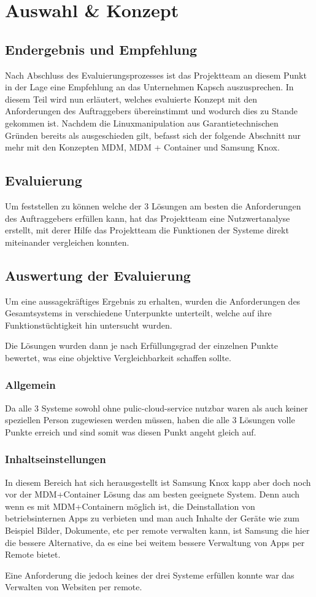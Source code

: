 \chapter{Auswahl \& Konzept}
\section{Endergebnis und Empfehlung}
Nach Abschluss des Evaluierungsprozesses ist das Projektteam an diesem Punkt in der Lage eine Empfehlung an das Unternehmen Kapsch auszusprechen. In diesem Teil wird nun erläutert, welches evaluierte Konzept mit den Anforderungen des Auftraggebers übereinstimmt und wodurch dies zu Stande gekommen ist. Nachdem die Linuxmanipulation aus Garantietechnischen Gründen bereits als ausgeschieden gilt, befasst sich der folgende Abschnitt nur mehr mit den Konzepten MDM, MDM + Container und Samsung Knox.
\section{Evaluierung}
Um feststellen zu können welche der 3 Lösungen am besten die Anforderungen des Auftraggebers erfüllen kann, hat das Projektteam eine Nutzwertanalyse erstellt, mit derer Hilfe das Projektteam die Funktionen der Systeme direkt miteinander vergleichen konnten.



\section{Auswertung der Evaluierung}
Um eine aussagekräftiges Ergebnis zu erhalten, wurden die Anforderungen des Gesamtsystems in verschiedene Unterpunkte unterteilt, welche auf ihre Funktionstüchtigkeit hin untersucht wurden. \par
Die Lösungen wurden dann je nach Erfüllungsgrad der einzelnen Punkte bewertet, was eine objektive Vergleichbarkeit schaffen sollte.
\subsection{Allgemein}
Da alle 3 Systeme sowohl ohne pulic-cloud-service nutzbar waren als auch keiner speziellen Person zugewiesen werden müssen, haben die alle 3 Lösungen volle Punkte erreich und sind somit was diesen Punkt angeht gleich auf.
\subsection{Inhaltseinstellungen}
In diesem Bereich hat sich herausgestellt ist Samsung Knox kapp aber doch noch vor der MDM+Container Lösung das am besten geeignete System. Denn auch wenn es mit MDM+Containern möglich ist, die Deinstallation von betriebsinternen Apps zu verbieten und man auch Inhalte der Geräte wie zum Beispiel Bilder, Dokumente, etc per remote verwalten kann, ist Samsung die hier die bessere Alternative, da es eine bei weitem bessere Verwaltung von Apps per Remote bietet. \par
Eine Anforderung die jedoch keines der drei Systeme erfüllen konnte war das Verwalten von Websiten per remote.
